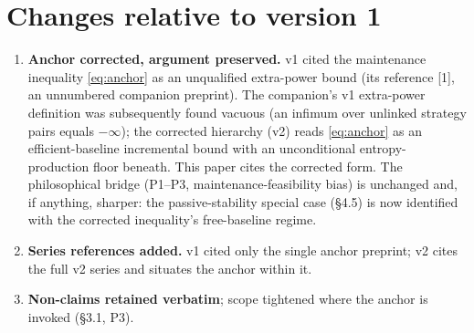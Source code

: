 \documentclass[11pt,a4paper]{article}
\begin{document}
\appendix

\section{Changes relative to version 1}

\begin{enumerate}
\item \textbf{Anchor corrected, argument preserved.} v1 cited the maintenance
inequality \eqref{eq:anchor} as an unqualified extra-power bound (its
reference [1], an unnumbered companion preprint). The companion's v1
extra-power definition was subsequently found vacuous (an infimum over
unlinked strategy pairs equals $-\infty$); the corrected hierarchy
\cite{Work,Anchor} (v2) reads \eqref{eq:anchor} as an efficient-baseline
incremental bound with an unconditional entropy-production floor beneath.
This paper cites the corrected form. The philosophical bridge (P1--P3,
maintenance-feasibility bias) is unchanged and, if anything, sharper: the
passive-stability special case (\S4.5) is now identified with the corrected
inequality's free-baseline regime.
\item \textbf{Series references added.} v1 cited only the single anchor
preprint; v2 cites the full v2 series and situates the anchor within it.
\item \textbf{Non-claims retained verbatim}; scope tightened where the anchor
is invoked (\S3.1, P3).
\end{enumerate}
\end{document}
